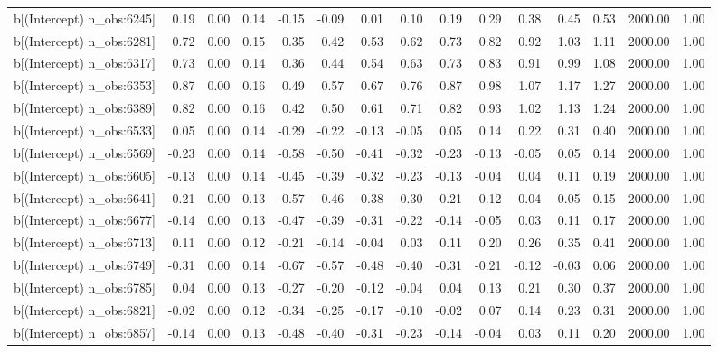 \begin{table}[ht]
\begin{tabular}{rrrrrrrrrrrrrrr}
  b[(Intercept) n\_obs:6245] & 0.19 & 0.00 & 0.14 & -0.15 & -0.09 & 0.01 & 0.10 & 0.19 & 0.29 & 0.38 & 0.45 & 0.53 & 2000.00 & 1.00 \\ 
  b[(Intercept) n\_obs:6281] & 0.72 & 0.00 & 0.15 & 0.35 & 0.42 & 0.53 & 0.62 & 0.73 & 0.82 & 0.92 & 1.03 & 1.11 & 2000.00 & 1.00 \\ 
  b[(Intercept) n\_obs:6317] & 0.73 & 0.00 & 0.14 & 0.36 & 0.44 & 0.54 & 0.63 & 0.73 & 0.83 & 0.91 & 0.99 & 1.08 & 2000.00 & 1.00 \\ 
  b[(Intercept) n\_obs:6353] & 0.87 & 0.00 & 0.16 & 0.49 & 0.57 & 0.67 & 0.76 & 0.87 & 0.98 & 1.07 & 1.17 & 1.27 & 2000.00 & 1.00 \\ 
  b[(Intercept) n\_obs:6389] & 0.82 & 0.00 & 0.16 & 0.42 & 0.50 & 0.61 & 0.71 & 0.82 & 0.93 & 1.02 & 1.13 & 1.24 & 2000.00 & 1.00 \\ 
  b[(Intercept) n\_obs:6533] & 0.05 & 0.00 & 0.14 & -0.29 & -0.22 & -0.13 & -0.05 & 0.05 & 0.14 & 0.22 & 0.31 & 0.40 & 2000.00 & 1.00 \\ 
  b[(Intercept) n\_obs:6569] & -0.23 & 0.00 & 0.14 & -0.58 & -0.50 & -0.41 & -0.32 & -0.23 & -0.13 & -0.05 & 0.05 & 0.14 & 2000.00 & 1.00 \\ 
  b[(Intercept) n\_obs:6605] & -0.13 & 0.00 & 0.14 & -0.45 & -0.39 & -0.32 & -0.23 & -0.13 & -0.04 & 0.04 & 0.11 & 0.19 & 2000.00 & 1.00 \\ 
  b[(Intercept) n\_obs:6641] & -0.21 & 0.00 & 0.13 & -0.57 & -0.46 & -0.38 & -0.30 & -0.21 & -0.12 & -0.04 & 0.05 & 0.15 & 2000.00 & 1.00 \\ 
  b[(Intercept) n\_obs:6677] & -0.14 & 0.00 & 0.13 & -0.47 & -0.39 & -0.31 & -0.22 & -0.14 & -0.05 & 0.03 & 0.11 & 0.17 & 2000.00 & 1.00 \\ 
  b[(Intercept) n\_obs:6713] & 0.11 & 0.00 & 0.12 & -0.21 & -0.14 & -0.04 & 0.03 & 0.11 & 0.20 & 0.26 & 0.35 & 0.41 & 2000.00 & 1.00 \\ 
  b[(Intercept) n\_obs:6749] & -0.31 & 0.00 & 0.14 & -0.67 & -0.57 & -0.48 & -0.40 & -0.31 & -0.21 & -0.12 & -0.03 & 0.06 & 2000.00 & 1.00 \\ 
  b[(Intercept) n\_obs:6785] & 0.04 & 0.00 & 0.13 & -0.27 & -0.20 & -0.12 & -0.04 & 0.04 & 0.13 & 0.21 & 0.30 & 0.37 & 2000.00 & 1.00 \\ 
  b[(Intercept) n\_obs:6821] & -0.02 & 0.00 & 0.12 & -0.34 & -0.25 & -0.17 & -0.10 & -0.02 & 0.07 & 0.14 & 0.23 & 0.31 & 2000.00 & 1.00 \\ 
  b[(Intercept) n\_obs:6857] & -0.14 & 0.00 & 0.13 & -0.48 & -0.40 & -0.31 & -0.23 & -0.14 & -0.04 & 0.03 & 0.11 & 0.20 & 2000.00 & 1.00 \\ 

\end{tabular}
\end{table}
